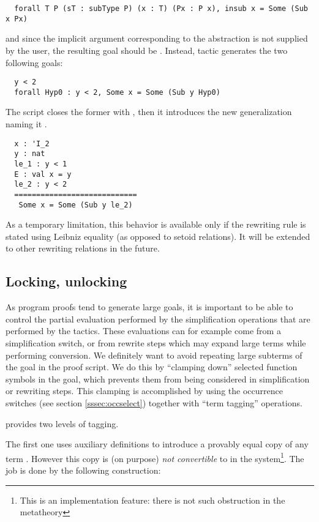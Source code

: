 \begin{lstlisting}
  forall T P (sT : subType P) (x : T) (Px : P x), insub x = Some (Sub x Px)
\end{lstlisting}

and since the implicit argument corresponding to the  abstraction is not
supplied by the user, the resulting goal should be . Instead, \ssr{}  tactic generates the two following
goals:
\begin{lstlisting}
  y < 2
  forall Hyp0 : y < 2, Some x = Some (Sub y Hyp0)
\end{lstlisting}
The script closes the former with , then it introduces
the new generalization naming it .

\begin{lstlisting}
  x : 'I_2
  y : nat
  le_1 : y < 1
  E : val x = y
  le_2 : y < 2
  ============================
   Some x = Some (Sub y le_2)
\end{lstlisting}

As a temporary limitation, this behavior is available only if the rewriting
rule is stated using Leibniz equality (as opposed to setoid relations).
It will be extended to other rewriting relations in the future.

\subsection{Locking, unlocking} \label{ssec:lock}

As program proofs tend to generate large goals, it is important to be
able to control the partial evaluation performed by the simplification
operations that are performed by the tactics. These evaluations can
for example come from a \ssrC{/=} simplification switch, or from rewrite steps
which may expand large terms while performing conversion. We definitely
want to avoid repeating large subterms of the goal in
the proof script. We do this by
``clamping down'' selected function symbols in the goal, which
prevents them from
being considered in simplification or rewriting steps. This clamping
is accomplished by using the occurrence switches (see section
\ref{sssec:occselect}) together with ``term tagging'' operations.

\ssr{} provides two levels of tagging.

The first one uses auxiliary definitions to introduce a provably equal
copy of any term . However this copy is (on purpose)
\emph{not convertible} to  in the \Coq{} system\footnote{This is
  an implementation feature: there is not such obstruction in the
  metatheory}. The job is done by the following construction:

